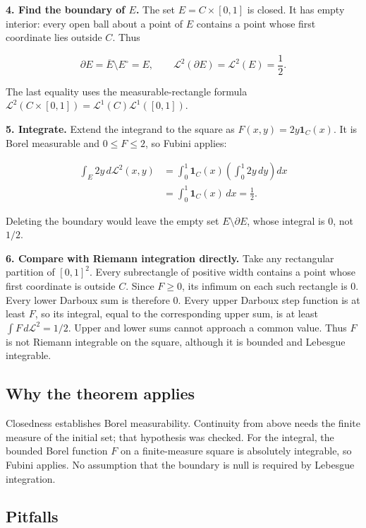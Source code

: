 \documentclass[
  11pt,
]{article}
\begin{document}
\textbf{4. Find the boundary of \(E\).} The set \(E=C\times[0,1]\) is
closed. It has empty interior: every open ball about a point of \(E\)
contains a point whose first coordinate lies outside \(C\). Thus

\[
\partial E=\overline E\setminus E^{\circ}=E,
\qquad \mathcal L^2(\partial E)=\mathcal L^2(E)=\frac12.
\]

The last equality uses the measurable-rectangle formula
\(\mathcal L^2(C\times[0,1])=\mathcal L^1(C)\mathcal L^1([0,1])\).

\textbf{5. Integrate.} Extend the integrand to the square as
\(F(x,y)=2y\mathbf 1_C(x)\). It is Borel measurable and
\(0\leq F\leq2\), so Fubini applies:

\[
\begin{aligned}
\int_E2y\,d\mathcal L^2(x,y)
&=\int_0^1\mathbf 1_C(x)\left(\int_0^1 2y\,dy\right)dx\\
&=\int_0^1\mathbf 1_C(x)\,dx
=\boxed{\frac12}.
\end{aligned}
\]

Deleting the boundary would leave the empty set
\(E\setminus\partial E\), whose integral is \(0\), not \(1/2\).

\textbf{6. Compare with Riemann integration directly.} Take any
rectangular partition of \([0,1]^2\). Every subrectangle of positive
width contains a point whose first coordinate is outside \(C\). Since
\(F\geq0\), its infimum on each such rectangle is \(0\). Every lower
Darboux sum is therefore \(0\). Every upper Darboux step function is at
least \(F\), so its integral, equal to the corresponding upper sum, is
at least \(\int F\,d\mathcal L^2=1/2\). Upper and lower sums cannot
approach a common value. Thus \(F\) is not Riemann integrable on the
square, although it is bounded and Lebesgue integrable.

\subsection{Why the theorem applies}\label{why-the-theorem-applies-1}

Closedness establishes Borel measurability. Continuity from above needs
the finite measure of the initial set; that hypothesis was checked. For
the integral, the bounded Borel function \(F\) on a finite-measure
square is absolutely integrable, so Fubini applies. No assumption that
the boundary is null is required by Lebesgue integration.

\subsection{Pitfalls}\label{pitfalls-1}
\end{document}
